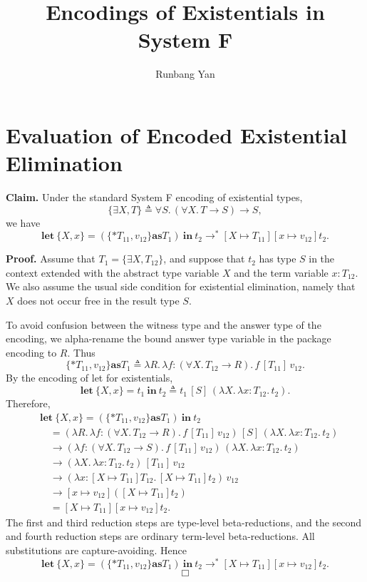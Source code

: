 \documentclass[nonacm]{acmart}
\newcommand{\letterm}[3]{\mathbf{let}\ \{#1\}=#2\ \mathbf{in}\ #3}
\newcommand{\as}{\mathrel{\mathbf{as}}}
\begin{document}
\title{Encodings of Existentials in System F}

\author{Runbang Yan}

\renewcommand{\shortauthors}{Yan}

\maketitle

\section{Evaluation of Encoded Existential Elimination}

\textbf{Claim.}
Under the standard System F encoding of existential types,
\[
\{\exists X, T\}
\triangleq
\forall S.\,(\forall X.\,T \to S) \to S,
\]
we have
\[
\letterm{X,x}{(\{*T_{11}, v_{12}\} \as T_1)}{t_2}
\longrightarrow^{*}
[X \mapsto T_{11}][x \mapsto v_{12}]t_2.
\]

\textbf{Proof.}
Assume that $T_1 = \{\exists X,T_{12}\}$, and suppose that $t_2$ has type $S$ in the context extended with the abstract type variable $X$ and the term variable $x:T_{12}$.
We also assume the usual side condition for existential elimination, namely that $X$ does not occur free in the result type $S$.

To avoid confusion between the witness type and the answer type of the encoding, we alpha-rename the bound answer type variable in the package encoding to $R$.
Thus
\[
\{*T_{11}, v_{12}\} \as T_1
\triangleq
\lambda R.\,\lambda f:(\forall X.\,T_{12}\to R).\,f\,[T_{11}]\,v_{12}.
\]
By the encoding of \textsf{let} for existentials,
\[
\letterm{X,x}{t_1}{t_2}
\triangleq
t_1\,[S]\,(\lambda X.\,\lambda x:T_{12}.\,t_2).
\]
Therefore,
\[
\begin{aligned}
&\letterm{X,x}{(\{*T_{11}, v_{12}\} \as T_1)}{t_2}
\\
&\quad =
(\lambda R.\,\lambda f:(\forall X.\,T_{12}\to R).\,f\,[T_{11}]\,v_{12})
\,[S]\,
(\lambda X.\,\lambda x:T_{12}.\,t_2)
\\
&\quad \longrightarrow
(\lambda f:(\forall X.\,T_{12}\to S).\,f\,[T_{11}]\,v_{12})
\,(\lambda X.\,\lambda x:T_{12}.\,t_2)
\\
&\quad \longrightarrow
(\lambda X.\,\lambda x:T_{12}.\,t_2)\,[T_{11}]\,v_{12}
\\
&\quad \longrightarrow
(\lambda x:[X\mapsto T_{11}]T_{12}.\,[X\mapsto T_{11}]t_2)\,v_{12}
\\
&\quad \longrightarrow
[x\mapsto v_{12}]([X\mapsto T_{11}]t_2)
\\
&\quad =
[X\mapsto T_{11}][x\mapsto v_{12}]t_2.
\end{aligned}
\]
The first and third reduction steps are type-level beta-reductions, and the second and fourth reduction steps are ordinary term-level beta-reductions.
All substitutions are capture-avoiding.
Hence
\[
\letterm{X,x}{(\{*T_{11}, v_{12}\} \as T_1)}{t_2}
\longrightarrow^{*}
[X \mapsto T_{11}][x \mapsto v_{12}]t_2.
\]
\[
\Box
\]
\end{document}
